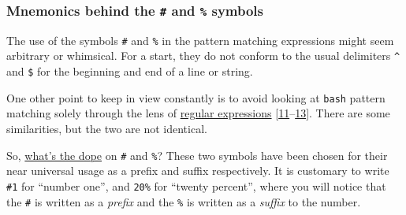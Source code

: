 \documentclass[
  a4paper,
]{article}
\newenvironment{Shaded}{\begin{snugshade}}{\end{snugshade}}
\newcommand{\BuiltInTok}[1]{\textcolor[rgb]{0.80,0.80,0.80}{#1}}
\newcommand{\CommentTok}[1]{\textcolor[rgb]{0.50,0.62,0.50}{#1}}
\newcommand{\NormalTok}[1]{\textcolor[rgb]{0.80,0.80,0.80}{#1}}
\newcommand{\OperatorTok}[1]{\textcolor[rgb]{0.94,0.94,0.82}{#1}}
\newcommand{\PreprocessorTok}[1]{\textcolor[rgb]{1.00,0.81,0.69}{\textbf{#1}}}
\newcommand{\StringTok}[1]{\textcolor[rgb]{0.80,0.58,0.58}{#1}}
\newcommand{\VariableTok}[1]{\textcolor[rgb]{0.80,0.80,0.80}{#1}}
\begin{document}
\begin{Shaded}
\end{Shaded}

\hypertarget{mnemonics-behind-the-and-symbols}{%
\subsubsection{\texorpdfstring{Mnemonics behind the \texttt{\#} and
\texttt{\%}
symbols}{Mnemonics behind the \# and \% symbols}}\label{mnemonics-behind-the-and-symbols}}

The use of the symbols \texttt{\#} and \texttt{\%} in the pattern
matching expressions might seem arbitrary or whimsical. For a start,
they do not conform to the usual delimiters \texttt{\^{}} and
\texttt{\$} for the beginning and end of a line or string.

One other point to keep in view constantly is to avoid looking at
\texttt{bash} pattern matching solely through the lens of
\href{https://www.regular-expressions.info/tutorial.html}{regular
expressions}
{[}\protect\hyperlink{ref-posixcharclass}{11}--\protect\hyperlink{ref-writeregexp}{13}{]}.
There are some similarities, but the two are not identical.

So,
\href{https://www.ldoceonline.com/dictionary/the-dope-on-somebody-something}{what's
the dope} on \texttt{\#} and \texttt{\%}? These two symbols have been
chosen for their near universal usage as a prefix and suffix
respectively. It is customary to write \texttt{\#1} for ``number one'',
and \texttt{20\%} for ``twenty percent'', where you will notice that the
\texttt{\#} is written as a \emph{prefix} and the \texttt{\%} is written
as a \emph{suffix} to the number.
\end{document}
